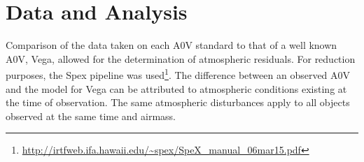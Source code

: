 \section{Data and Analysis}

Comparison of the data taken on each A0V standard to that of a well known A0V, Vega, allowed for the determination of atmospheric residuals.  %
For reduction purposes, the Spex pipeline was used\footnote{\url{http://irtfweb.ifa.hawaii.edu/~spex/SpeX_manual_06mar15.pdf}}.  The difference between an observed A0V and the model for Vega can be attributed to atmospheric conditions existing at the time of observation.  The same atmospheric disturbances apply to all objects observed at the same time and airmass. \cite{Cushing_2004}